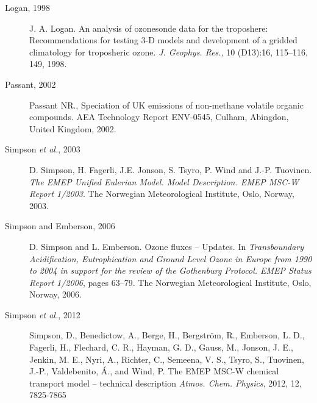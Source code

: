 \documentclass[a4paper,12pt]{report}
\begin{document}
\begin{description}
\item[Logan, 1998] J. A. Logan. An analysis of ozonesonde data for the
  troposhere: Recommendations for testing 3-D models and development
  of a gridded climatology for troposheric ozone. {\it
    J. Geophys. Res.}, 10 (D13):16, 115--116, 149, 1998.

\item[Passant, 2002] Passant NR., Speciation of UK emissions of non-methane 
volatile organic compounds. AEA Technology Report ENV-0545, Culham, Abingdon,
United Kingdom, 2002.

\item[Simpson {\sl et al.}, 2003] D. Simpson, H. Fagerli, J.E. Jonson, 
                    S. Tsyro, P. Wind and J.-P. Tuovinen.
{\it The EMEP Unified Eulerian Model. Model Description. EMEP MSC-W Report
1/2003}. The Norwegian
Meteorological Institute, Oslo, Norway, 2003.


\item[Simpson and Emberson, 2006] D. Simpson and L. Emberson. Ozone
  fluxes -- Updates.  
 In {\it Transboundary Acidification,
  Eutrophication  and Ground Level Ozone in Europe from 1990 to 2004
  in support for the review of the Gothenburg Protocol. EMEP Status
                   Report 1/2006}, pages 63--79. The Norwegian
Meteorological Institute, Oslo, Norway, 2006. 

%
\item[Simpson {\sl et al.}, 2012]
Simpson, D., Benedictow, A., Berge, H., Bergstr{\"o}m, R., Emberson, L. D., Fagerli, H., Flechard, C. R., Hayman, G. D., Gauss, M., Jonson, J. E., Jenkin, M. E., Nyri, A., Richter, C., Semeena, V. S., Tsyro, S., Tuovinen, J.-P., Valdebenito, \'A., and Wind, P. The EMEP MSC-W chemical transport model -- technical description {\it Atmos. Chem. Physics}, 2012, 12, 7825-7865


\end{description}
\end{document}
